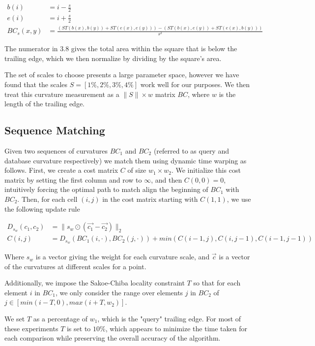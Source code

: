 \begin{align}
b(i) &= i - \frac{s}{2}\\
e(i) &= i + \frac{s}{2}\\
BC_s(x,y) &= \frac{(ST(b(x), b(y)) + ST(e(x), e(y))) - (ST(b(x), e(y)) + ST(e(x), b(y)))}{s^2}
\end{align}

The numerator in 3.8 gives the total area within the square that is below the trailing edge, which we then normalize by dividing by the square's area.

The set of scales to choose presents a large parameter space, however we have found that the scales $S = [1\%, 2\%, 3\%, 4\%]$ work well for our purposes.
We then treat this curvature measurement as a $\|S\| \times w$ matrix $BC$, where $w$ is the length of the trailing edge.

\subsection{Sequence Matching}

Given two sequences of curvatures $BC_1$ and $BC_2$ (referred to as query and database curvature respectively) we match them using dynamic time warping as follows.
First, we create a cost matrix $C$ of size $w_1 \times w_2$. 
We initialize this cost matrix by setting the first column and row to $\infty$, and then $C(0,0) = 0$, intuitively forcing the optimal path to match align the beginning of $BC_1$ with $BC_2$.
Then, for each cell $(i,j)$ in the cost matrix starting with $C(1,1)$, we use the following update rule

\begin{align}
D_{s_w}(c_1, c_2) &= \lVert s_w \odot (\vec{c_1} - \vec{c_2}) \rVert_2\\
C(i,j) &= D_{s_w}(BC_1(i,\cdot),BC_2(j,\cdot)) + min(C(i-1,j), C(i,j-1), C(i-1, j-1))
\end{align}

Where $s_w$ is a vector giving the weight for each curvature scale, and $\vec{c}$ is a vector of the curvatures at different scales for a point.

Additionally, we impose the Sakoe-Chiba \cite{sakoe1978dynamic} locality constraint $T$ so that for each element $i$ in $BC_1$, we only consider the range over elements $j$ in $BC_2$ of $j \in [min(i - T, 0), max(i + T, w_2)]$.

We set $T$ as a percentage of $w_1$, which is the "query" trailing edge.
For most of these experiments $T$ is set to $10\%$, which appears to minimize the time taken for each comparison while preserving the overall accuracy of the algorithm.

